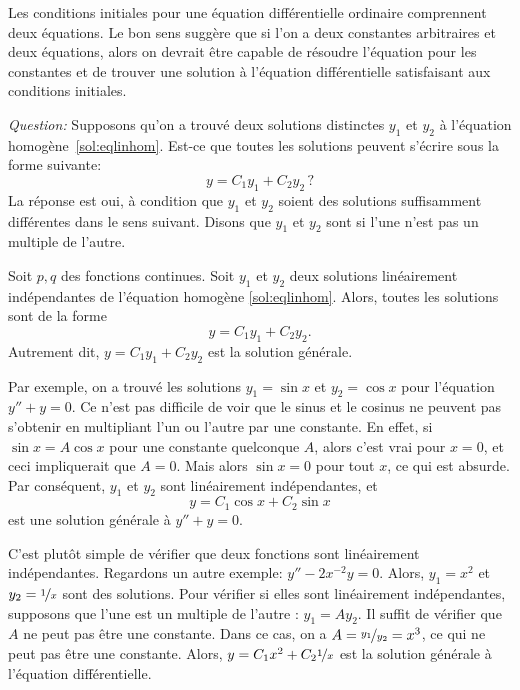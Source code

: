 \medskip

Les conditions initiales pour une équation différentielle ordinaire comprennent deux équations. Le bon sens suggère que si l'on a deux constantes arbitraires et deux équations, alors on devrait être capable de résoudre l'équation pour les constantes et de trouver une solution à l'équation différentielle satisfaisant aux conditions initiales. 

\emph{Question:} Supposons qu'on a trouvé deux solutions distinctes $y_1$ et $y_2$ à l'équation homogène~\eqref{sol:eqlinhom}.  Est-ce que toutes les solutions peuvent s'écrire sous la forme suivante:
%
\begin{equation*}
y = C_1 y_1 + C_2 y_2\,?
\end{equation*}
%
La réponse est oui, à condition que $y_1$ et $y_2$ soient des solutions suffisamment différentes dans le sens suivant.  Disons que $y_1$ et $y_2$ sont \emph{} si l'une n'est pas un multiple de l'autre.

\begin{theorem}
Soit $p, q$ des fonctions continues.
Soit $y_1$ et $y_2$ deux solutions linéairement indépendantes de l'équation homogène \eqref{sol:eqlinhom}. 
Alors, toutes les solutions sont de la forme 
\begin{equation*}
y = C_1 y_1 + C_2 y_2 .
\end{equation*}
Autrement dit, $y = C_1 y_1 + C_2 y_2$ est la solution générale.
\end{theorem}

Par exemple, on a trouvé les solutions 
$y_1 = \sin x$ et $y_2 = \cos x$ pour l'équation $y'' + y = 0$.  Ce n'est pas difficile de voir que le sinus et le cosinus ne peuvent pas s'obtenir en multipliant l'un ou l'autre par une constante.
En effet, si $\sin x = A \cos x$ pour une constante quelconque $A$,
alors c'est vrai pour $x=0$, et ceci impliquerait que  $A = 0$.  
Mais alors $\sin x = 0$ pour tout $x$, ce qui est absurde.
Par conséquent, $y_1$ et $y_2$ sont linéairement indépendantes, et
\begin{equation*}
	y = C_1 \cos x + C_2 \sin x 
\end{equation*}
est une solution générale à $y'' + y = 0$.


C'est plutôt simple de vérifier que deux fonctions sont linéairement indépendantes. 
Regardons un autre exemple:    $y''-2x^{-2}y = 0$.  
Alors, $y_1 = x^2$ et $y_2 = \nicefrac{1}{x}$ sont des solutions.  
Pour vérifier si elles sont linéairement indépendantes, supposons que l'une est un  multiple de l'autre : 
$y_1 = A y_2$.  Il suffit de vérifier que  $A$ ne peut pas être une constante.  
Dans ce cas, on a $A = \nicefrac{y_1}{y_2} = x^3$, ce qui ne peut pas être une constante. 
Alors, $y = C_1 x^2 + C_2 \nicefrac{1}{x}$ est la solution générale à l'équation différentielle.

